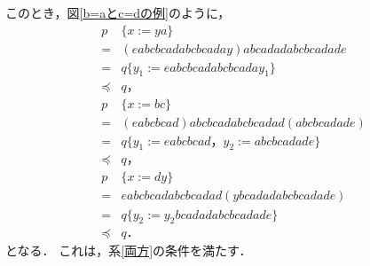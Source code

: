 このとき，図\ref{b=aとc=dの例}のように，
\begin{eqnarray*}
&p& \{ x:=ya \} \\ 
& = & (eabcbcadabcbcaday)abcadadabcbcadade\\
& = & q \{ y_{1} := eabcbcadabcbcaday_{1} \} \\
& \preceq & q，\\
&p& \{ x:=bc \}  \\
& = & (eabcbcad)abcbcadabcbcadad(abcbcadade) \\
& = & q \{ y_{1} := eabcbcad，y_{2} := abcbcadade \} \\
& \preceq & q，\\
&p& \{ x:=dy \}  \\
& = & eabcbcadabcbcadad(ybcadadabcbcadade) \\
& = & q \{ y_{2} := y_{2}bcadadabcbcadade \} \\
& \preceq & q．
\end{eqnarray*}
となる．
これは，系\ref{両方}の条件を満たす．

